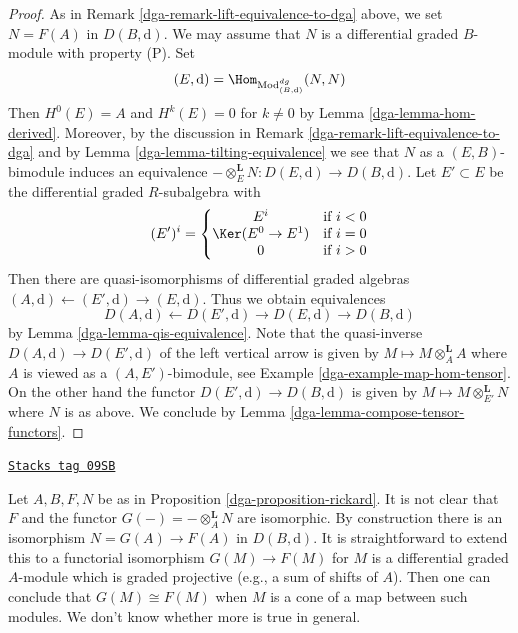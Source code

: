 \begin{proof}

As in Remark \ref{dga-remark-lift-equivalence-to-dga} above, we set $N = F(A)$
in $D(B, \text{d})$. We may assume that $N$ is a differential graded
$B$-module with property (P). Set
$$
(E, \text{d}) = \Hom_{\text{Mod}^{dg}_{(B, \text{d})}}(N, N)
$$
Then $H^0(E) = A$ and $H^k(E) = 0$ for $k \not = 0$ by
Lemma \ref{dga-lemma-hom-derived}.
Moreover, by the discussion in Remark \ref{dga-remark-lift-equivalence-to-dga}
and by Lemma \ref{dga-lemma-tilting-equivalence}
we see that $N$ as a $(E, B)$-bimodule induces an
equivalence $- \otimes_E^\mathbf{L} N : D(E, \text{d}) \to D(B, \text{d})$.
Let $E' \subset E$ be the differential graded $R$-subalgebra
with
$$
(E')^i = \left\{
\begin{matrix}
E^i & \text{if }i < 0 \\
\Ker(E^0 \to E^1) & \text{if }i = 0 \\
0 & \text{if }i > 0
\end{matrix}
\right.
$$
Then there are quasi-isomorphisms of differential graded
algebras $(A, \text{d}) \leftarrow (E', \text{d}) \rightarrow (E, \text{d})$.
Thus we obtain equivalences
$$
D(A, \text{d}) \leftarrow D(E', \text{d}) \rightarrow D(E, \text{d})
\rightarrow D(B, \text{d})
$$
by Lemma \ref{dga-lemma-qis-equivalence}.
Note that the quasi-inverse $D(A, \text{d}) \to D(E', \text{d})$
of the left vertical arrow is given
by $M \mapsto M \otimes_A^\mathbf{L} A$ where $A$ is viewed as a
$(A, E')$-bimodule, see Example \ref{dga-example-map-hom-tensor}.
On the other hand the functor $D(E', \text{d}) \to D(B, \text{d})$ is given by
$M \mapsto M \otimes_{E'}^\mathbf{L} N$ where $N$ is as above.
We conclude by Lemma \ref{dga-lemma-compose-tensor-functors}.
\end{proof}

\begin{remark}[Rickard]
\label{dga-remark-rickard}
\href{https://stacks.math.columbia.edu/tag/09SB}{\texttt{Stacks tag 09SB}}

Let $A, B, F, N$ be as in Proposition \ref{dga-proposition-rickard}.
It is not clear that $F$ and the functor
$G(-) = - \otimes_A^\mathbf{L} N$ are isomorphic.
By construction there is an isomorphism
$N = G(A) \to F(A)$ in $D(B, \text{d})$.
It is straightforward to extend this to a functorial isomorphism
$G(M) \to F(M)$ for $M$ is a differential graded $A$-module which
is graded projective (e.g., a sum of shifts of $A$).
Then one can conclude that $G(M) \cong F(M)$ when $M$ is a cone
of a map between such modules. We don't know whether more is true
in general.
\end{remark}

